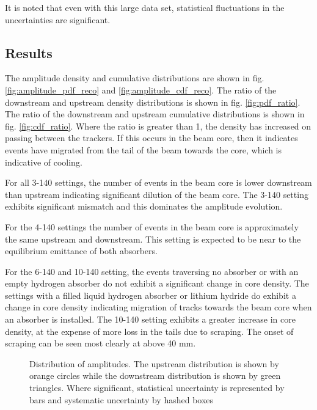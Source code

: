 It is noted that even with this large data set, statistical fluctuations in
the uncertainties are significant.

\clearpage

\subsection{Results}

The amplitude density and cumulative distributions are shown in fig. 
\ref{fig:amplitude_pdf_reco} and \ref{fig:amplitude_cdf_reco}. The ratio of the 
downstream and upstream density distributions is shown in fig. 
\ref{fig:pdf_ratio}. The ratio of the downstream and upstream cumulative
distributions is shown in fig. \ref{fig:cdf_ratio}. Where the ratio is greater
than 1, the density has increased on passing between the trackers. If this 
occurs in the beam core, then it indicates events have migrated from the tail of
the beam towards the core, which is indicative of cooling.

For all 3-140 settings, the number of events in the beam core is lower 
downstream than upstream indicating significant dilution of the beam core. The 
3-140 setting exhibits significant mismatch and this dominates the amplitude 
evolution.

For the 4-140 settings the number of events in the beam core is approximately
the same upstream and downstream. This setting is expected to be near to the
equilibrium emittance of both absorbers.

For the 6-140 and 10-140 setting, the events traversing no absorber or with an
empty hydrogen absorber do not exhibit a significant change in core density.
The settings with a filled liquid hydrogen absorber or lithium hydride do 
exhibit a change in core density indicating migration of tracks towards the beam
core when an absorber is installed. The 10-140 setting exhibits a greater 
increase in core density, at the expense of more loss in the tails due to 
scraping. The onset of scraping can be seen most clearly at above 40 mm.

\begin{figure}[!tbh]
    \centering
    {Distribution of amplitudes. The upstream distribution is shown by orange
    circles while the downstream distribution is shown by green triangles. Where
    significant, statistical uncertainty is represented by bars and systematic 
    uncertainty by hashed boxes}
\end{figure}

